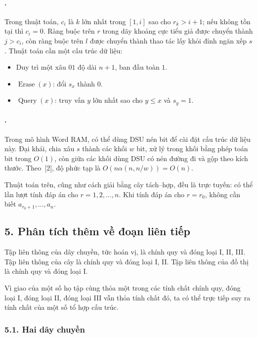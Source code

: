 \documentclass[11pt]{article}
\begin{document}
\paragraph{.}
Trong thuật toán, $c_i$ là $k$ lớn nhất trong $[1,i]$ sao cho $r_k>i+1$; nếu
không tồn tại thì $c_i=0$. Ràng buộc trên $r$ trong dãy khoảng cực tiểu giả
được chuyển thành $j>c_i$, còn ràng buộc trên $l$ được chuyển thành thao tác
lấy khỏi đỉnh ngăn xếp $s$. Thuật toán cần một cấu trúc dữ liệu:
\begin{itemize}
  \item Duy trì một xâu $01$ độ dài $n+1$, ban đầu toàn $1$.
  \item $\operatorname{Erase}(x)$: đổi $s_x$ thành $0$.
  \item $\operatorname{Query}(x)$: truy vấn $y$ lớn nhất sao cho
  $y\le x$ và $s_y=1$.
\end{itemize}

\paragraph{.}
Trong mô hình Word RAM, có thể dùng DSU nén bit để cài đặt cấu trúc dữ liệu
này. Đại khái, chia xâu $s$ thành các khối $w$ bit, xử lý trong khối bằng phép
toán bit trong $O(1)$, còn giữa các khối dùng DSU có nén đường đi và gộp theo
kích thước. Theo~[2], độ phức tạp là
$O(n\alpha(n,n/w))=O(n)$.

Thuật toán trên, cũng như cách giải bằng cây tách--hợp, đều là trực tuyến:
có thể lần lượt tính đáp án cho $r=1,2,\ldots,n$. Khi tính đáp án cho
$r=r_0$, không cần biết $a_{r_0+1},\ldots,a_n$.

\subsection*{5. Phân tích thêm về đoạn liên tiếp}

Tập liên thông của dây chuyền, tức hoán vị, là chính quy và đóng loại I, II,
III. Tập liên thông của cây là chính quy và đóng loại I, II. Tập liên thông
của đồ thị là chính quy và đóng loại I.

Vì giao của một số họ tập cùng thỏa một trong các tính chất chính quy, đóng
loại I, đóng loại II, đóng loại III vẫn thỏa tính chất đó, ta có thể trực tiếp
suy ra tính chất của một số tổ hợp cấu trúc.

\subsubsection*{5.1. Hai dây chuyền}
\end{document}
